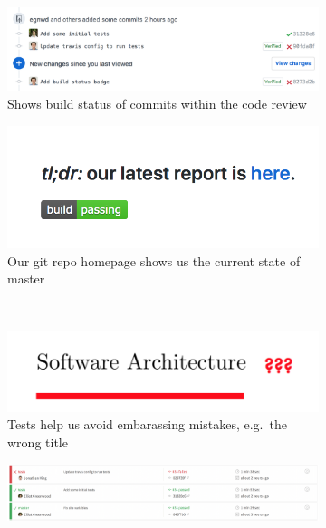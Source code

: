 \begin{figure}[ht]
  \centering
  \begin{subfigure}[h]{0.4\linewidth}
    \centering
    \includegraphics[width=\linewidth]{ci-1.png}
    \caption{Shows build status of commits within the code review}
    \label{fig:ci-1}
  \end{subfigure}
  \hfill
  \begin{subfigure}[h]{0.4\linewidth}
    \centering
    \includegraphics[width=\linewidth]{ci-2.png}
    \caption{Our git repo homepage shows us the current state of master}
    \label{fig:ci-2}
  \end{subfigure}
  \\
  \begin{subfigure}[h]{0.4\linewidth}
    \centering
    \includegraphics[width=\linewidth]{ci-3.png}
    \caption{Tests help us avoid embarassing mistakes, e.g.~the wrong title}
    \label{fig:ci-3}
  \end{subfigure}
  \hfill
  \begin{subfigure}[h]{0.4\linewidth}
    \centering
    \includegraphics[width=\linewidth]{ci-4.png}

\end{subfigure}
\end{figure}
